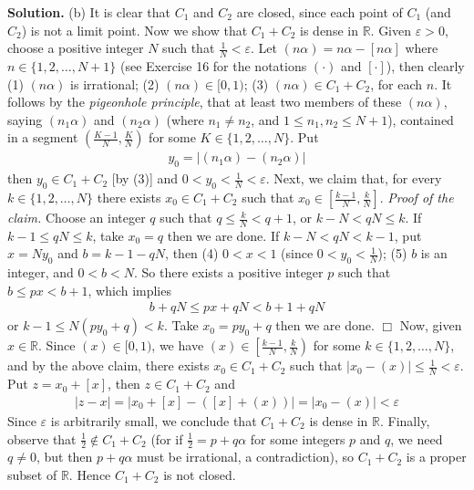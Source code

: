 \documentclass[12pt]{article}
\theoremstyle{definition}
\begin{document}
\smallskip
\noindent\textbf{Solution.}\quad
(b) It is clear that $C_1$ and $C_2$ are closed, since each point of $C_1$ (and $C_2$) is not a limit point. Now we show that $C_1+C_2$ is dense in $\mathbb{R}$. Given $\varepsilon>0$, choose a positive integer $N$ such that $\frac{1}{N}<\varepsilon$. Let $(n\alpha)=n\alpha-[n\alpha]$ where $n\in\{1,2,\ldots,N+1\}$ (see Exercise 16 for the notations $(\cdot)$ and $[\cdot]$), then clearly 
(1) $(n\alpha)$ is irrational;
(2) $(n\alpha)\in[0,1)$;
(3) $(n\alpha)\in C_1+C_2$,
for each $n$. It follows by the \textit{pigeonhole principle}, that at least two members of these $(n\alpha)$, saying $(n_1\alpha)$ and $(n_2\alpha)$ (where $n_1\ne n_2$, and $1\le n_1,n_2\le N+1$), contained in a segment $\left(\tfrac{K-1}{N},\tfrac{K}{N}\right)$  for some $K\in\{1,2,\ldots,N\}$. Put
\begin{align*}
y_0=\left\vert(n_1\alpha)-(n_2\alpha)\right\vert
\end{align*}
then $y_0\in C_1+C_2$ [by (3)] and $0<y_0<\frac{1}{N}<\varepsilon$. Next, we claim that, for every $k\in\{1,2,\ldots,N\}$ there exists $x_0\in C_1+C_2$ such that $x_0\in\left[\tfrac{k-1}{N},\tfrac{k}{N}\right]$.
\textit{Proof of the claim.} Choose an integer $q$ such that $q\le\frac{k}{N}<q+1$, or $k-N<qN\le k$. If $k-1\le qN\le k$, take $x_0=q$ then we are done. If $k-N<qN<k-1$, put $x=Ny_0$ and $b=k-1-qN$, then
(4) $0<x<1$ (since $0<y_0<\frac{1}{N}$);
(5) $b$ is an integer, and $0<b<N$.
So there exists a positive integer $p$ such that $b\le px<b+1$, which implies
\begin{align*}
b+qN\le px+qN<b+1+qN
\end{align*}
or $k-1\le N\left(py_0+q\right)<k$. Take $x_0=py_0+q$ then we are done. $\Box$
Now, given $x\in \mathbb{R}$. Since $(x)\in[0,1)$, we have $(x)\in\left[\tfrac{k-1}{N},\tfrac{k}{N}\right)$ for some $k\in\{1,2,\ldots,N\}$, and by the above claim, there exists $x_0\in C_1+C_2$ such that $\left\vert x_0-(x)\right\vert\le\frac{1}{N}<\varepsilon$. Put $z=x_0+[x]$, then $z\in C_1+C_2$ and
\begin{align*}
\left\vert z-x\right\vert
=\left\vert x_0+[x]-\left([x]+(x)\right)\right\vert
=\left\vert x_0-(x)\right\vert
<\varepsilon
\end{align*}
Since $\varepsilon$ is arbitrarily small, we conclude that $C_1+C_2$ is dense in $\mathbb{R}$. Finally, observe that $\frac{1}{2}\notin C_1+C_2$ (for if $\frac{1}{2}=p+q\alpha$ for some integers $p$ and $q$, we need $q\ne 0$, but then $p+q\alpha$ must be irrational, a contradiction), so $C_1+C_2$ is a proper subset of $\mathbb{R}$. Hence $C_1+C_2$ is not closed.
\end{document}
